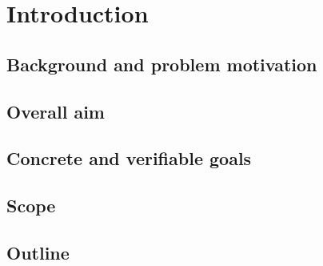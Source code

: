 \chapter{Introduction}
    \section{Background and problem motivation}
    \section{Overall aim}
    \section{Concrete and verifiable goals}
    \section{Scope}
    \section{Outline}
